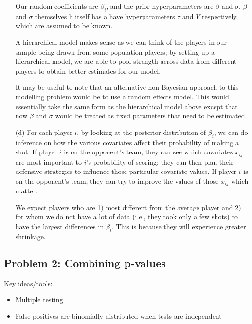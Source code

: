 \begin{enumerate}
Our random coefficients are $\beta_i$, and the prior hyperparameters are $\beta$ and $\sigma$. $\beta$ and $\sigma$ themselves h itself has a have hyperparameters $\tau$ and $V$ respectively, which are assumed to be known.

A hierarchical model makes sense as we can think of the players in our sample being drawn from some population players; by setting up a hierarchical model, we are able to pool strength across data from different players to obtain better estimates for our model.

It may be useful to note that an alternative non-Bayesian approach to this modelling problem would be to use a random effects model. This would essentially take the same form as the hierarchical model above except that now $\beta$ and $\sigma$ would be treated as fixed parameters that need to be estimated. 

\item[(d)] For each player $i$, by looking at the posterior distribution of $\beta_i$, we can do inference on how the various covariates affect their probability of making a shot. If player $i$ is on the opponent's team, they can see which covariates $x_{ij}$ are most important to $i$'s probability of scoring; they can then plan their defensive strategies to influence those particular covariate values. If player $i$ is on the opponent's team, they can try to improve the values of those $x_{ij}$ which matter.

We expect players who are 1) most different from the average player and 2) for whom we do not have a lot of data (i.e., they took only a few shots) to have the largest differences in $\beta_i$. This is because they will experience greater shrinkage.

\end{enumerate}
	  

\subsection*{Problem 2: Combining p-values}
Key ideas/tools:
\begin{itemize}
\item Multiple testing
\item False positives are binomially distributed when tests are independent
\end{itemize}

